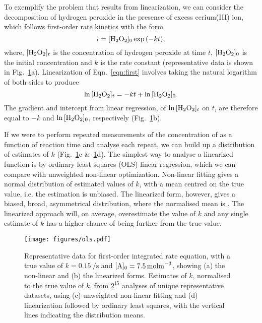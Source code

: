\documentclass[journal=jceda8,manuscript=article]{achemso}
\begin{document}
To exemplify the problem that results from linearization, we can consider the decomposition of hydrogen peroxide  in the presence of excess cerium(III) ion, which follows first-order rate kinetics with the form~\cite{monk_math_2010}
%
\begin{equation}
    [\ce{H2O2}]_t = [\ce{H2O2}]_0\exp{(-kt)},
    \label{eqn:first}
\end{equation}
%
where, $[\ce{H2O2}]_t$ is the concentration of hydrogen peroxide at time $t$, $[\ce{H2O2}]_0$ is the initial concentration and $k$ is the rate constant (representative data is shown in Fig.~\ref{fig:ols}a).
Linearization of Eqn.~\ref{eqn:first} involves taking the natural logarithm of both sides to produce
%
\begin{equation}
    \ln{[\ce{H2O2}]_t} = -kt + \ln{[\ce{H2O2}]_0}.
    \label{eqn:log}
\end{equation}
%
The gradient and intercept from linear regression, of $\ln{[\ce{H2O2}]_t}$ on $t$, are therefore equal to $-k$ and $\ln{[\ce{H2O2}]_0}$, respectively (Fig.~\ref{fig:ols}b).

If we were to perform repeated measurements of the concentration of  as a function of reaction time and analyse each repeat, we can build up a distribution of estimates of $k$ (Fig.~\ref{fig:ols}c \&~\ref{fig:ols}d). 
The simplest way to analyse a linearized function is by ordinary least squares (OLS) linear regression, which we can compare with unweighted non-linear optimization. 
Non-linear fitting gives a normal distribution of estimated values of $k$, with a mean centred on the true value, i.e. the estimation is unbiased. 
The linearized form, however, gives a biased, broad, asymmetrical distribution, where the normalised mean is .
The linearized approach will, on average, overestimate the value of $k$ and any single estimate of $k$ has a higher chance of being further from the true value. 
%
\begin{figure}
  \texttt{[image: figures/ols.pdf]}
  \caption{
    Representative data for first-order integrated rate equation, with a true value of $k=\SI{0.15}{\per\second}$ and $[\ce{A}]_0=\SI{7.5}{\mol\m^{-3}}$, showing (a) the non-linear and (b) the linearized forms. 
    Estimates of $k$, normalised to the true value of $k$, from $2^{15}$ analyses of unique representative datasets, using (c) unweighted non-linear fitting and (d) linearization followed by ordinary least squares, with the vertical lines indicating the distribution means.
    }
  \label{fig:ols}
\end{figure}
%
\end{document}
